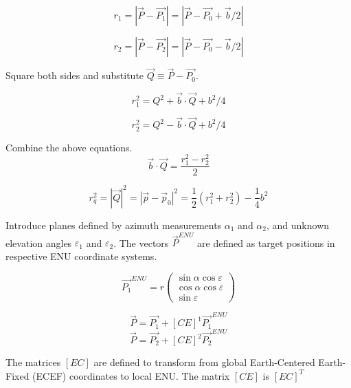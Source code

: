 \documentclass[12pt]{article}
\begin{document}
	\begin{equation}
		r_1 = |\vec{P} - \vec{P_1}| = |\vec{P} - \vec{P_0} + \vec{b}/2|
	\end{equation}
	
	\begin{equation}
		r_2 = |\vec{P} - \vec{P_2}| = |\vec{P} - \vec{P_0} - \vec{b}/2|
	\end{equation}

	Square both sides and substitute $\vec{Q} \equiv \vec{P} - \vec{P_0}$.
	
	\begin{equation}
		r_1^2 = Q^2 + \vec{b} \cdot \vec{Q} + b^2/4
	\end{equation}

	\begin{equation}
		r_2^2 = Q^2 - \vec{b} \cdot \vec{Q} + b^2/4
	\end{equation}
	
	Combine the above equations.
	\begin{equation}
		\vec{b} \cdot \vec{Q}=\frac{r_1^2-r_2^2}{2}
	\end{equation}
	
	\begin{equation}
		r_q^2=|\vec{Q}|^2=\left|\vec{p}-\vec{p}_0\right|^2=\frac{1}{2}\left(r_1^2+r_2^2\right)-\frac{1}{4} b^2
	\end{equation}	
	
	Introduce planes defined by azimuth measurements $\alpha_1$  and $\alpha_2$, and unknown elevation angles
	$\varepsilon_1$  and $\varepsilon_2$. The vectors $\vec{P}^{ENU}$ are defined as target positions in respective ENU
	coordinate systems.
	
	\begin{equation}
		\vec{P_1}^{ENU} = r\left(\begin{array}{c}
			\sin\alpha \cos\varepsilon \\
			\cos\alpha \cos\varepsilon \\
			\sin\varepsilon
			\end{array}\right)
			\label{eq:pos_vec_enu}
	\end{equation}	
	
	\begin{equation}
		\vec{P} = \vec{P_1} + [CE]^1 \vec{P_1}^{ENU}
	\end{equation}	
	\begin{equation}
		\vec{P} = \vec{P_2} + [CE]^2 \vec{P_2}^{ENU}
	\end{equation}

	The matrices $[EC]$ are defined to transform from global Earth-Centered Earth-Fixed (ECEF) coordinates to local
	ENU. The matrix $[CE]$ is $[EC]^T$
	
\end{document}
